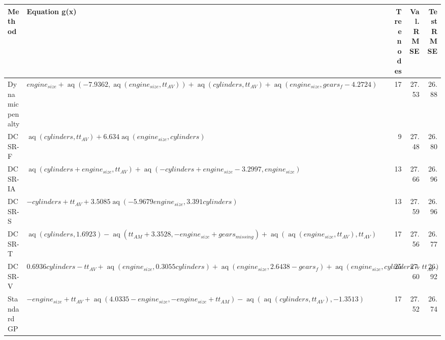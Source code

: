 \begin{tabular}{lp{8cm}rrr}
\toprule
Method & Equation g(x) & Tree nodes & Val. RMSE & Test RMSE \\
\midrule
Dynamic penalty & $engine_{size} + \operatorname{aq}{\left(-7.9362,\operatorname{aq}{\left(engine_{size},tt_{AV} \right)} \right)} + \operatorname{aq}{\left(cylinders,tt_{AV} \right)} + \operatorname{aq}{\left(engine_{size},gears_{f} - 4.2724 \right)}$ & 17 & 27.53 & 26.88 \\
DCSR-F & $\operatorname{aq}{\left(cylinders,tt_{AV} \right)} + 6.634 \operatorname{aq}{\left(engine_{size},cylinders \right)}$ & 9 & 27.48 & 26.80 \\
DCSR-IA & $\operatorname{aq}{\left(cylinders + engine_{size},tt_{AV} \right)} + \operatorname{aq}{\left(- cylinders + engine_{size} - 3.2997,engine_{size} \right)}$ & 13 & 27.66 & 26.96 \\
DCSR-S & $- cylinders + tt_{AV} + 3.5085 \operatorname{aq}{\left(- 5.9679 engine_{size},3.391 cylinders \right)}$ & 13 & 27.59 & 26.96 \\
DCSR-T & $\operatorname{aq}{\left(cylinders,1.6923 \right)} - \operatorname{aq}{\left(tt_{AM} + 3.3528,- engine_{size} + gears_{missing} \right)} + \operatorname{aq}{\left(\operatorname{aq}{\left(engine_{size},tt_{AV} \right)},tt_{AV} \right)}$ & 17 & 27.56 & 26.77 \\
DCSR-V & $0.6936 cylinders - tt_{AV} + \operatorname{aq}{\left(engine_{size},0.3055 cylinders \right)} + \operatorname{aq}{\left(engine_{size},2.6438 - gears_{f} \right)} + \operatorname{aq}{\left(engine_{size},cylinders + tt_{AV} \right)}$ & 25 & 27.60 & 26.92 \\
Standard GP & $- engine_{size} + tt_{AV} + \operatorname{aq}{\left(4.0335 - engine_{size},- engine_{size} + tt_{AM} \right)} - \operatorname{aq}{\left(\operatorname{aq}{\left(cylinders,tt_{AV} \right)},-1.3513 \right)}$ & 17 & 27.52 & 26.74 \\
\bottomrule
\end{tabular}
